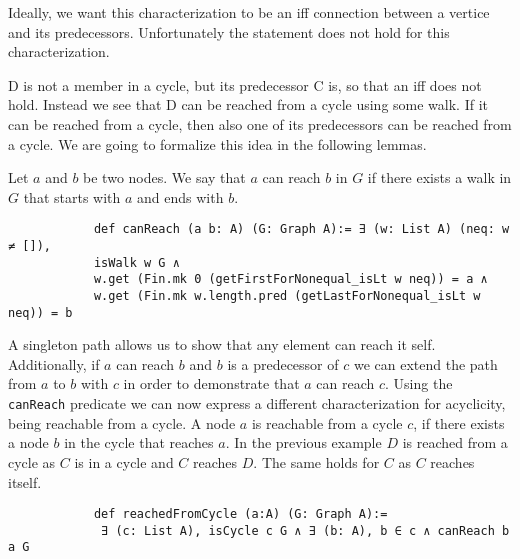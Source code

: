 \documentclass{article}
\begin{document}
        Ideally, we want this characterization to be an iff connection between a vertice and its predecessors. Unfortunately the statement does not hold for this characterization.


        D is not a member in a cycle, but its predecessor C is, so that an iff does not hold. Instead we see that D can be reached from a cycle using some walk. If it can be reached from a cycle, then also one of its predecessors can be reached from a cycle. We are going to formalize this idea in the following lemmas.

        Let $a$ and $b$ be two nodes. We say that $a$ can reach $b$ in $G$ if there exists a walk in $G$ that starts with $a$ and ends with $b$.

        \begin{lstlisting}
            def canReach (a b: A) (G: Graph A):= ∃ (w: List A) (neq: w ≠ []),
            isWalk w G ∧
            w.get (Fin.mk 0 (getFirstForNonequal_isLt w neq)) = a ∧
            w.get (Fin.mk w.length.pred (getLastForNonequal_isLt w neq)) = b
        \end{lstlisting}

        A singleton path allows us to show that any element can reach it self. Additionally, if $a$ can reach $b$ and $b$ is a predecessor of $c$ we can extend the path from $a$ to $b$ with $c$ in order to demonstrate that $a$ can reach $c$. Using the \texttt{canReach} predicate we can now express a different characterization for acyclicity, being reachable from a cycle. A node $a$ is reachable from a cycle $c$, if there exists a node $b$ in the cycle that reaches $a$. In the previous example $D$ is reached from a cycle as $C$ is in a cycle and $C$ reaches $D$. The same holds for $C$ as $C$ reaches itself.

        \begin{lstlisting}
            def reachedFromCycle (a:A) (G: Graph A):=
             ∃ (c: List A), isCycle c G ∧ ∃ (b: A), b ∈ c ∧ canReach b a G
        \end{lstlisting}
\end{document}
